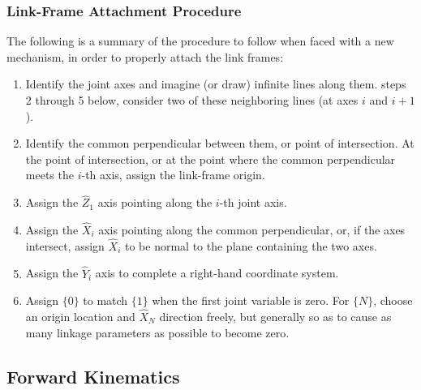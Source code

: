 \documentclass[10pt,a4paper]{article}
\begin{document}
\subsubsection{Link-Frame Attachment Procedure}
The following is a summary of the procedure to follow when faced with a new mechanism, in order to properly attach the link frames:
\begin{enumerate}
	\item Identify the joint axes and imagine (or draw) infinite lines along them. steps 2 through 5 below, consider two of these neighboring lines (at axes $i$ and $i + 1$).
	\item Identify the common perpendicular between them, or point of intersection. At the point of intersection, or at the point where the common perpendicular meets the $i$-th axis, assign the link-frame origin. 
	\item Assign the $\hat{Z}_1$ axis pointing along the $i$-th joint axis. 
	\item Assign the $\hat{X}_i$ axis pointing along the common perpendicular, or, if the axes intersect, assign $\hat{X}_i$ to be normal to the plane containing the two axes. 
	\item Assign the $\hat{Y}_i$ axis to complete a right-hand coordinate system. 
	\item Assign $\{0\}$ to match $\{1\}$ when the first joint variable is zero. For $\{N\}$, choose an origin location and $\hat{X}_N$ direction freely, but generally so as to cause as many linkage parameters as possible to become zero.
\end{enumerate}

\subsection{Forward Kinematics}
\end{document}

